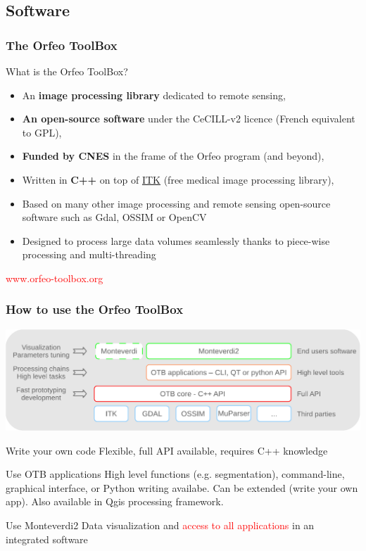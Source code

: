 \documentclass[8pt]{beamer}
\begin{document}
\subsection{Software}
\begin{frame}
\frametitle{The Orfeo ToolBox}
\begin{block}{What is the Orfeo ToolBox?}
\begin{itemize}
\item An \textbf{image processing library} dedicated to remote sensing,
\item \textbf{An open-source software} under the CeCILL-v2 licence (French equivalent to GPL),
\item \textbf{Funded by CNES} in the frame of the Orfeo program (and beyond),
\item Written in \textbf{C++} on top of \href{www.itk.org}{ITK} (free medical image processing library),
\item Based on many other image processing and remote sensing open-source software such as Gdal, OSSIM or OpenCV
\item Designed to process large data volumes seamlessly thanks to piece-wise processing and multi-threading
\end{itemize}
\end{block}
\begin{center}
{\huge\textcolor{red}{www.orfeo-toolbox.org}}
\end{center}
\end{frame}


\begin{frame}
\frametitle{How to use the Orfeo ToolBox}
\vspace{-0.5cm}
\begin{center}
\includegraphics[width=\textwidth]{../OTB-General/images/sandwich.pdf}
\end{center}
\vspace{-0.5cm}
\begin{block}{Write your own code}
 Flexible, full API available, requires C++ knowledge
\end{block}
\begin{block}{Use OTB applications}
  High level functions (e.g. segmentation), command-line, graphical interface, or Python writing availabe. Can be extended (write your own app). Also available in Qgis processing framework.
\end{block}
\begin{block}{Use Monteverdi2}
Data visualization and  \textcolor{red}{access to all applications} in an integrated software
\end{block}
\end{frame}
\end{document}
